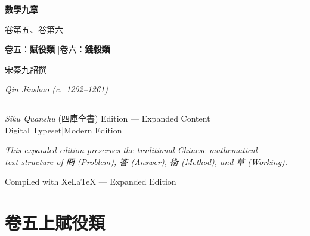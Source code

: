 \documentclass[11pt,a4paper]{article}
\begin{document}
\begin{titlepage}
\centering
\vspace*{3cm}

{\fontsize{38}{46}\selectfont\color{titlecolor}\CJKfamily{}\textbf{數學九章}}

\vspace{1.5cm}

{\fontsize{20}{24}\selectfont\color{sectioncolor} 卷第五、卷第六}

\vspace{2cm}

{\Large\color{sectioncolor} 卷五：\textbf{賦役類} \quad|\quad 卷六：\textbf{錢穀類}}

\vspace{3cm}

{\large 宋\quad 秦九韶\quad 撰}

\vspace{0.5cm}

{\normalsize\textit{Qin Jiushao (c.\ 1202–1261)}}

\vspace{2cm}

{\color{rulecolor}\rule{0.6\textwidth}{0.4pt}}

\vspace{1.5cm}

{\small\color{sectioncolor}
\textit{Siku Quanshu} (四庫全書) Edition — Expanded Content\\[0.5em]
Digital Typeset\quad|\quad Modern Edition}

\vfill
{\small\color{notecolor}
\textit{This expanded edition preserves the traditional Chinese mathematical\\
text structure of 問 (Problem), 答 (Answer), 術 (Method), and 草 (Working).}}

\vspace{1cm}
{\small\color{sectioncolor} Compiled with XeLaTeX — Expanded Edition}
\end{titlepage}

\tableofcontents
\newpage


\newpage
\section*{\color{titlecolor}卷五上\quad 賦役類}
\end{document}
